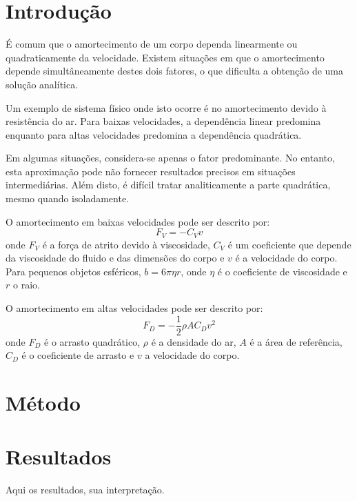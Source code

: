 \section{Introdução} 
É comum que o amortecimento de um corpo dependa linearmente ou quadraticamente da velocidade. 
Existem situações em que o amortecimento depende simultâneamente destes dois fatores, o que dificulta a obtenção de uma solução analítica.

Um exemplo de sistema físico onde isto ocorre é no amortecimento devido à resistência do ar. Para baixas velocidades, a dependência linear predomina enquanto para altas velocidades predomina a dependência quadrática.

Em algumas situações, considera-se apenas o fator predominante. No entanto, esta aproximação pode não fornecer resultados precisos em situações intermediárias. Além disto, é difícil tratar analiticamente a parte quadrática, mesmo quando isoladamente.

O amortecimento em baixas velocidades pode ser descrito por\cite{stokes_wiki}:
$$F_V=-C_V v$$
onde $F_V$ é a força de atrito devido à viscosidade, $C_V$ é um coeficiente que depende da viscosidade do fluido e das dimensões do corpo e $v$ é a velocidade do corpo. Para pequenos objetos esféricos, $b=6\pi \eta r$, onde $\eta$ é o coeficiente de viscosidade e $r$ o raio.

O amortecimento em altas velocidades pode ser descrito por\cite{drag1_wiki}:
$$F_D=-\frac{1}{2}\rho A C_D v^2$$
onde $F_D$ é o arrasto quadrático, $\rho$ é a densidade do ar, $A$ é a área de referência, $C_D$ é o coeficiente de arrasto e $v$ a velocidade do corpo.

\section{Método}


\section{Resultados}
 Aqui os resultados, sua interpretação.


